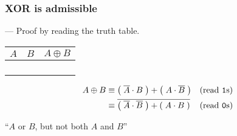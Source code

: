 

\begin{frame}

\frametitle{XOR is admissible}

\begin{flushright}
--- Proof by reading the truth table.
\end{flushright}

\begin{center}

\begin{tabular}{cc|>{\centering\arraybackslash}p{0.4in}}
$A$ & $B$ & $A \oplus B$ \\\hline
\bz{} & \bz{} & \bz{} \\
\bz{} & \bo{} & \bo{} \\
\bo{} & \bz{} & \bo{} \\
\bo{} & \bo{} & \bz{}
\end{tabular}

\begin{minipage}[t][0.9in]{\textwidth}
\begin{align*}
A \oplus B %
&\equiv \p{\overline{A} \cdot B} + \p{A \cdot \overline{B}} & \text{(read \texttt{1}s)}\\
&\equiv \overline{\p{\overline{A} \cdot \overline{B}} + \p{A \cdot B}} & \text{(read \texttt{0}s)}
\end{align*}
\end{minipage}

``$A$ or $B$, but not both $A$ and $B$''

\end{center}

\end{frame}


